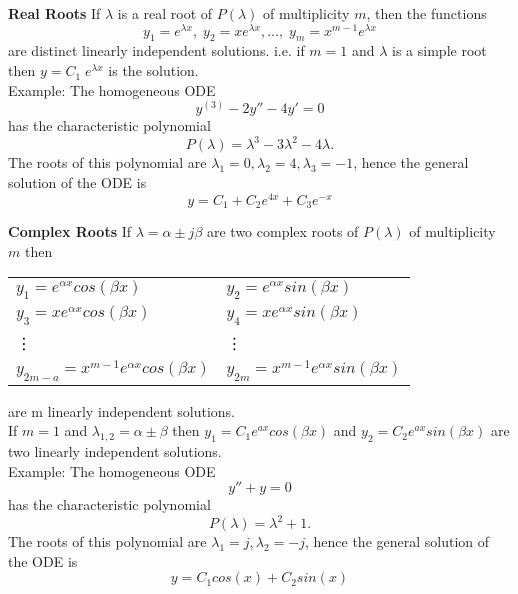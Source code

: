 \textbf{Real Roots}
If $\lambda$ is a real root of $P(\lambda)$ of multiplicity $m$, then the functions
\begin{equation}
  y_1 =e^{\lambda x}, \;   y_2 =xe^{\lambda x} ,...,\;   y_m =x^{m-1}e^{\lambda x}
\end{equation}
are distinct linearly independent solutions. i.e. if $m = 1$ and $\lambda$ is a simple root then $y = C_1\; e^{\lambda x}$ is the solution.\\
Example: The homogeneous ODE
\begin{equation}
  y^{(3)}- 2y'' - 4y' = 0
\end{equation}
has the characteristic polynomial
\begin{equation}
  P(\lambda) = \lambda^3 - 3\lambda^2 - 4\lambda.
\end{equation}
The roots of this polynomial are $\lambda_1 = 0, \lambda_2 = 4, \lambda_3 = -1$, hence the general solution of
the ODE is
\begin{equation}
  y = C_1 + C_2 e^{4x} + C_3e^{-x}
\end{equation}

\textbf{Complex Roots}
If $\lambda = \alpha \pm j\beta$ are two complex roots of $P(\lambda)$ of multiplicity $m$ then
\begin{table}[H]
  \begin{tabular}{ll}
    $y_1 = e^{\alpha x} cos(\beta x)$ &   $y_2 = e^{\alpha x} sin(\beta x)$\\
    $y_3 = xe^{\alpha x} cos(\beta x)$ &   $y_4 = xe^{\alpha x} sin(\beta x)$\\
    \vdots  & \vdots \\
    $y_{2m-a} = x^{m-1}e^{\alpha x} cos(\beta x)$ &   $y_{2m} = x^{m-1}e^{\alpha x} sin(\beta x)$
  \end{tabular}
\end{table}
are m linearly independent solutions.\\
If $m = 1$ and $\lambda_{1,2} = \alpha \pm \beta$ then $y_1 = C_1 e^{ax}cos(\beta x)$ and $y_2 = C_2 e^{ax}sin(\beta x)$ are two linearly
independent solutions.\\
Example: The homogeneous ODE
\begin{equation}
  y'' + y = 0
\end{equation}
has the characteristic polynomial
\begin{equation}
  P(\lambda) = \lambda^2 + 1.
\end{equation}
The roots of this polynomial are $\lambda_1 = j, \lambda_2 = -j$, hence the general solution of the ODE is
\begin{equation}
  y = C_1 cos(x) + C_2 sin(x)
\end{equation}

